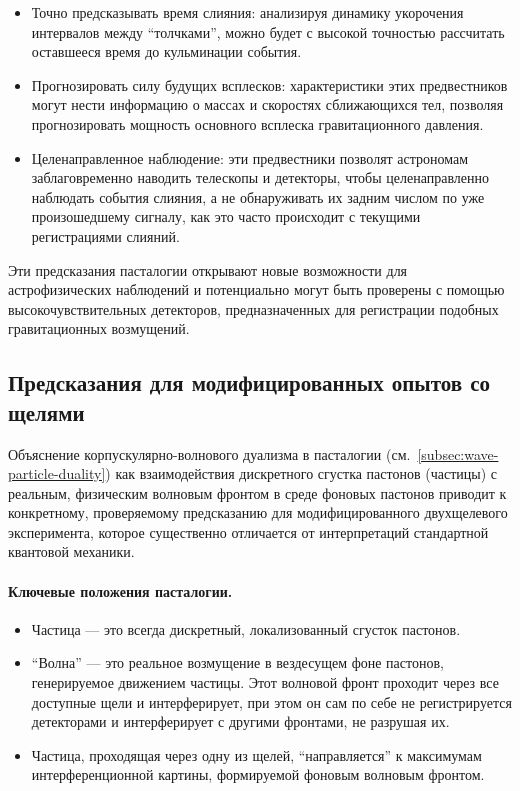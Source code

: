 \documentclass[pdflatex,sn-mathphys-num]{sn-jnl}
\begin{document}
\begin{enumerate}
    \begin{itemize}
        \item Точно предсказывать время слияния: анализируя динамику укорочения интервалов между ``толчками'', можно будет с высокой точностью рассчитать оставшееся время до кульминации события.
        \item Прогнозировать силу будущих всплесков: характеристики этих предвестников могут нести информацию о массах и скоростях сближающихся тел, позволяя прогнозировать мощность основного всплеска гравитационного давления.
        \item Целенаправленное наблюдение: эти предвестники позволят астрономам заблаговременно наводить телескопы и детекторы, чтобы целенаправленно наблюдать события слияния, а не обнаруживать их задним числом по уже произошедшему сигналу, как это часто происходит с текущими регистрациями слияний.
    \end{itemize}
\end{enumerate}

Эти предсказания пасталогии открывают новые возможности для астрофизических наблюдений и потенциально могут быть проверены с помощью высокочувствительных детекторов, предназначенных для регистрации подобных гравитационных возмущений.

\subsection{Предсказания для модифицированных опытов со щелями}\label{subsec:slit-experiments}

Объяснение корпускулярно-волнового дуализма в пасталогии (см.~\ref{subsec:wave-particle-duality}) как взаимодействия дискретного сгустка пастонов (частицы) с реальным, физическим волновым фронтом в среде фоновых пастонов приводит к конкретному, проверяемому предсказанию для модифицированного двухщелевого эксперимента, которое существенно отличается от интерпретаций стандартной квантовой механики.

\paragraph{Ключевые положения пасталогии.}
\begin{itemize}
    \item Частица --- это всегда дискретный, локализованный сгусток пастонов.
    \item ``Волна'' --- это реальное возмущение в вездесущем фоне пастонов, генерируемое движением частицы. Этот волновой фронт проходит через все доступные щели и интерферирует, при этом он сам по себе не регистрируется детекторами и интерферирует с другими фронтами, не разрушая их.
    \item Частица, проходящая через одну из щелей, ``направляется'' к максимумам интерференционной картины, формируемой фоновым волновым фронтом.
\end{itemize}
\end{document}
